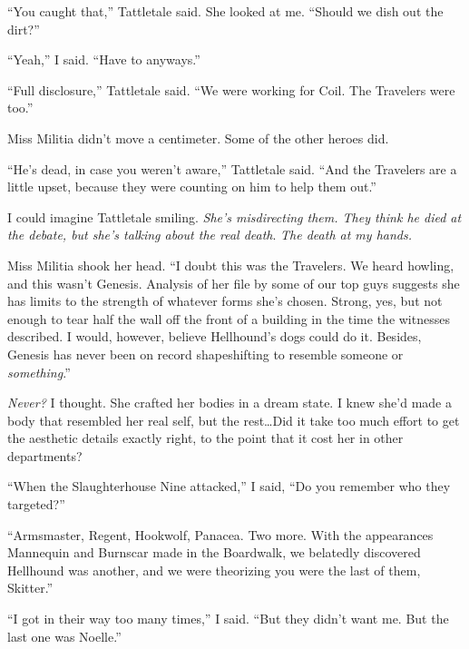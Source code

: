 ``You caught that,'' Tattletale said.  She looked at me.  ``Should we dish out the dirt?''



``Yeah,'' I said.  ``Have to anyways.''



``Full disclosure,'' Tattletale said.  ``We were working for Coil.  The Travelers were too.''



Miss Militia didn't move a centimeter.  Some of the other heroes did.



``He's dead, in case you weren't aware,'' Tattletale said.  ``And the Travelers are a little upset, because they were counting on him to help them out.''



I could imagine Tattletale smiling.  \emph{She's misdirecting them.  They think he died at the debate, but she's talking about the real death}.  \emph{The death at my hands.}



Miss Militia shook her head.  ``I doubt this was the Travelers.  We heard howling, and this wasn't Genesis.  Analysis of her file by some of our top guys suggests she has limits to the strength of whatever forms she's chosen.  Strong, yes, but not enough to tear half the wall off the front of a building in the time the witnesses described.  I would, however, believe Hellhound's dogs could do it.  Besides, Genesis has never been on record shapeshifting to resemble someone or \emph{something}.''



\emph{Never?} I thought.  She crafted her bodies in a dream state.  I knew she'd made a body that resembled her real self, but the rest\ldots  Did it take too much effort to get the aesthetic details exactly right, to the point that it cost her in other departments?



``When the Slaughterhouse Nine attacked,'' I said, ``Do you remember who they targeted?''



``Armsmaster, Regent, Hookwolf, Panacea.  Two more.  With the appearances Mannequin and Burnscar made in the Boardwalk, we belatedly discovered Hellhound was another, and we were theorizing you were the last of them, Skitter.''



``I got in their way too many times,'' I said.  ``But they didn't want me.  But the last one was Noelle.''



